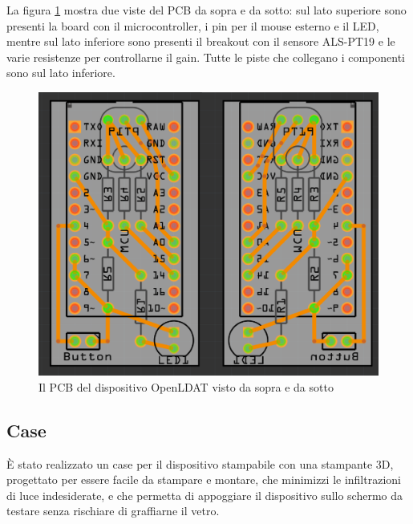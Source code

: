 La figura \ref{fig:pcb} mostra due viste del PCB da sopra e da sotto: sul lato superiore sono presenti la board con il microcontroller, i pin per il mouse esterno e il LED, mentre sul lato inferiore sono presenti il breakout con il sensore ALS-PT19 e le varie resistenze per controllarne il gain. Tutte le piste che collegano i componenti sono sul lato inferiore.
\begin{figure}[h]
	\centering
	\includegraphics[width=\textwidth]{Dispositivo_files/openldat_pcb.png}
	\caption{Il PCB del dispositivo OpenLDAT visto da sopra e da sotto}
	\label{fig:pcb}
\end{figure}

\subsection{Case}
È stato realizzato un case per il dispositivo stampabile con una stampante 3D, progettato per essere facile da stampare e montare, che minimizzi le infiltrazioni di luce indesiderate, e che permetta di appoggiare il dispositivo sullo schermo da testare senza rischiare di graffiarne il vetro.

